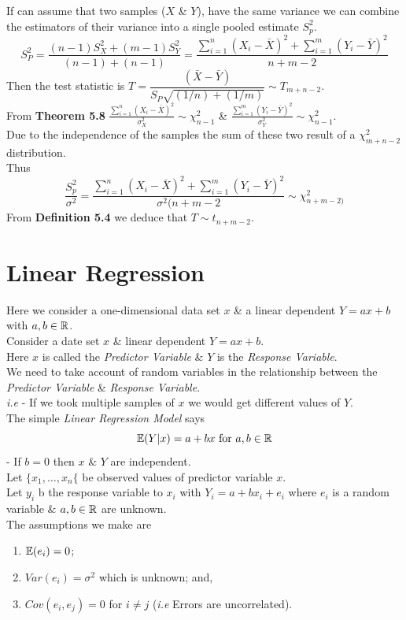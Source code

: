 \documentclass[11pt,a4paper]{article}
\begin{document}
If can assume that two samples ($X$ \& $Y$), have the same variance we can combine the estimators of their variance into a single pooled estimate $S_p^2$.
$$S_P^2=\dfrac{(n-1)S_X^2+(m-1)S_Y^2}{(n-1)+(n-1)}=\dfrac{\sum_{i=1}^n(X_i-\bar{X})^2+\sum_{i=1}^m(Y_i-\bar{Y})^2}{n+m-2}$$
Then the test statistic is $T=\dfrac{(\bar{X}-\bar{Y})}{S_P\sqrt{(1/n)+(1/m)}}\sim T_{m+n-2}$.\\
From \textbf{Theorem 5.8} $\frac{\sum_{i=1}^n(X_i-\bar{X})^2}{\sigma_X^2}\sim\chi_{n-1}^2$ \& $\frac{\sum_{i=1}^m(Y_i-\bar{Y})^2}{\sigma_Y^2}\sim\chi_{n-1}^2$.\\
Due to the independence of the samples the sum of these two result of a $\chi^2_{m+n-2}$ distribution.\\
Thus
$$\dfrac{S_p^2}{\sigma^2}=\dfrac{\sum_{i=1}^n(X_i-\bar{X})^2+\sum_{i=1}^m(Y_i-\bar{Y})^2}{\sigma^2(n+m-2}\sim\chi^2_{n+m-2)}$$
\nb From \textbf{Definition 5.4} we deduce that $T\sim t_{n+m-2}$.\\

\section{Linear Regression}

Here we consider a one-dimensional data set $x$ \& a linear dependent $Y=ax+b$ with $a,b\in\mathbb{R}$.\\

Consider a date set $x$ \& linear dependent $Y=ax+b$.\\
Here $x$ is called the \textit{Predictor Variable} \& $Y$ is the \textit{Response Variable}.\\

We need to take account of random variables in the relationship between the \textit{Predictor Variable} \& \textit{Response Variable}.\\
\textit{i.e} - If we took multiple samples of $x$ we would get different values of $Y$.\\

The simple \textit{Linear Regression Model} says
$$\expect(Y|x)=a+bx\ \mathrm{for}\ a,b\in\real$$
\nb - If $b=0$ then $x$ \& $Y$ are independent.\\

Let $\{x_1,\dots,x_n\{$ be observed values of predictor variable $x$.\\
Let $y_i$ b the response variable to $x_i$ with $Y_i=a+bx_i+e_i$ where $e_i$ is a random variable \& $a,b\in\mathbb{R}$ are unknown.\\
The assumptions we make are
\begin{enumerate}
	\item $\mathbb{E}(e_i)=0$;
	\item $Var(e_i)=\sigma^2$ which is unknown; and,
	\item $Cov(e_i,e_j)=0$ for $i\neq j$ (\textit{i.e} Errors are uncorrelated).
\end{enumerate}
\end{document}
